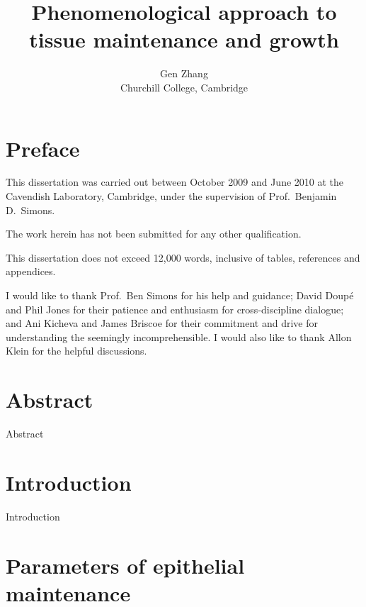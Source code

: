 \documentclass[10pt,english]{report}
\begin{document}
\author{Gen Zhang\\
	Churchill College, Cambridge}
\title{Phenomenological approach to tissue maintenance and growth}

\maketitle

\setlength{\parindent}{0pt} 
\setlength{\parskip}{1.4ex}


\chapter*{Preface}

This dissertation was carried out between October 2009 and June 2010 at the Cavendish Laboratory, Cambridge, under the supervision of Prof.\ Benjamin D.\ Simons.

The work herein has not been submitted for any other qualification.

This dissertation does not exceed 12,000 words, inclusive of tables, references and appendices.

I would like to thank Prof.\ Ben Simons for his help and guidance; David Doup\'e and Phil Jones for their patience and enthusiasm for cross-discipline dialogue; and Ani Kicheva and James Briscoe for their commitment and drive for understanding the seemingly incomprehensible. I would also like to thank Allon Klein for the helpful discussions.

\chapter*{Abstract}

Abstract


\tableofcontents

\chapter{Introduction}
\setcounter{page}{1}

Introduction \citep{clayton}

\chapter{Parameters of epithelial maintenance}
\end{document}
